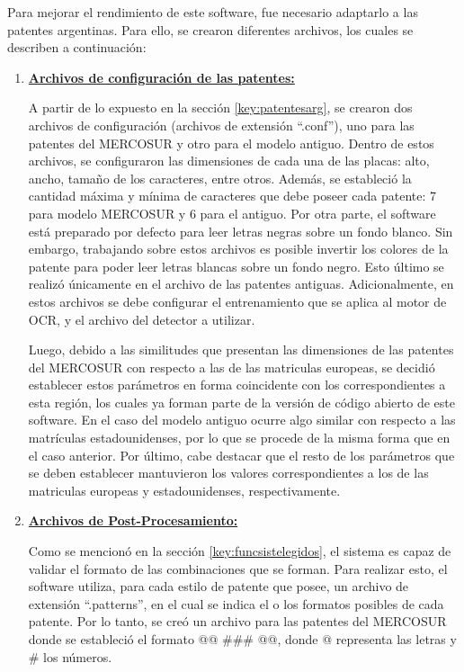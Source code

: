 Para mejorar el rendimiento de este software, fue necesario adaptarlo a las patentes argentinas. Para ello, se crearon diferentes archivos, los cuales se describen a continuación:	
		
\begin{enumerate}
	\item \textbf{\underline{Archivos de configuración de las patentes:}}
	
	A partir de lo expuesto en la sección \ref{key:patentesarg}, se crearon dos archivos de configuración (archivos de extensión ``.conf''), uno para las patentes del MERCOSUR y otro para el modelo antiguo. Dentro de estos archivos, se configuraron las dimensiones de cada una de las placas: alto, ancho, tamaño de los caracteres, entre otros. Además, se estableció la cantidad máxima y mínima de caracteres que debe poseer cada patente: 7 para modelo MERCOSUR y 6 para el antiguo. Por otra parte, el software está preparado por defecto para leer letras negras sobre un fondo blanco. Sin embargo, trabajando sobre estos archivos es posible invertir los colores de la patente para poder leer letras blancas sobre un fondo negro. Esto último se realizó únicamente en el archivo de las patentes antiguas. Adicionalmente, en estos archivos se debe configurar el entrenamiento que se aplica al motor de OCR, y el archivo del detector a utilizar. 
	
	Luego, debido a las similitudes que presentan las dimensiones de las patentes del MERCOSUR con respecto a las de las matriculas europeas, se decidió establecer estos parámetros en forma coincidente con los correspondientes a esta región, los cuales ya forman parte de la versión de código abierto de este software. En el caso del modelo antiguo ocurre algo similar con respecto a las matrículas estadounidenses, por lo que se procede de la misma forma que en el caso anterior. Por último, cabe destacar que el resto de los parámetros que se deben establecer mantuvieron los valores correspondientes a los de las matriculas europeas y estadounidenses, respectivamente.
	
	\item \textbf{\underline{Archivos de Post-Procesamiento:}}
	
	Como se mencionó en la sección \ref{key:funcsistelegidos}, el sistema es capaz de validar el formato de las combinaciones que se forman. Para realizar esto, el software utiliza, para cada estilo de patente que posee, un archivo de extensión ``.patterns'', en el cual se indica el o los formatos posibles de cada patente. Por lo tanto, se creó un archivo para las patentes del MERCOSUR donde se estableció el formato @@ \#\#\# @@, donde @ representa las letras  y \# los números. 
	

\end{enumerate}
